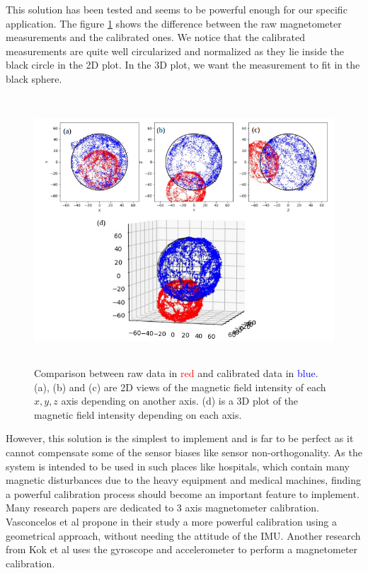 \documentclass{article}
\begin{document}
This solution has been tested and seems to be powerful enough for our specific application. The figure \ref{fig:cal_plots} shows the difference between the raw magnetometer measurements and the calibrated ones. We notice that the calibrated measurements are quite well circularized and normalized as they lie inside the black circle in the 2D plot. In the 3D plot, we want the measurement to fit in the black sphere.

\begin{figure}[H]
    \centering
    \includegraphics[height=10cm]{images/calibration_plot.png}
    \caption[Comparison between raw and calibrated data]
    {Comparison between raw data in \textcolor{red}{red} and calibrated data in \textcolor{blue}{blue}. (a), (b) and (c) are 2D views of the magnetic field intensity of each $x, y, z$ axis depending on another axis. (d) is a 3D plot of the magnetic field intensity depending on each axis.}
    \label{fig:cal_plots}
\end{figure}

However, this solution is the simplest to implement and is far to be perfect as it cannot compensate some of the sensor biases like sensor non-orthogonality. As the system is intended to be used in such places like hospitals, which contain many magnetic disturbances due to the heavy equipment and medical machines, finding a powerful calibration process should become an important feature to implement. Many research papers are dedicated to 3 axis magnetometer calibration. Vasconcelos et al propone in their study \cite{vasconcelos} a more powerful calibration using a geometrical approach, without needing the attitude of the IMU. Another research from Kok et al \cite{kok} uses the gyroscope and accelerometer to perform a magnetometer calibration.
\end{document}
